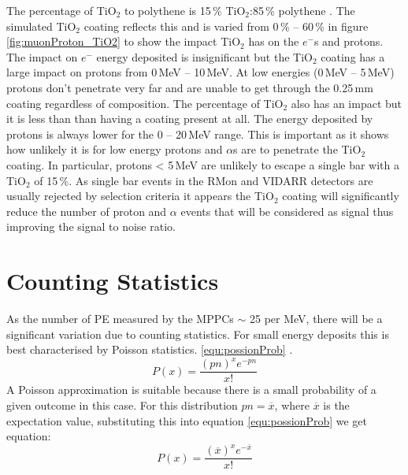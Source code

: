 
The percentage of TiO$_2$ to polythene is 15\,\% TiO$_2$:85\,\% polythene \cite{aliaga2014design} \cite{Pla-Dalmau2014}. The simulated TiO$_2$ coating reflects this and is varied from 0\,\% -- 60\,\% in figure \ref{fig:muonProton_TiO2} to show the impact TiO$_2$ has on the $e^-$s and protons. The impact on $e^-$ energy deposited is insignificant but the TiO$_2$ coating has a large impact on protons from 0\,MeV -- 10\,MeV. At low energies (0\,MeV -- 5\,MeV) protons don't penetrate very far and are unable to get through the 0.25\,mm coating regardless of composition. The percentage of TiO$_2$ also has an impact but it is less than than having a coating present at all. The energy deposited by protons is always lower for the 0 -- 20\,MeV range. This is important as it shows how unlikely it is for low energy protons and $\alpha$s are to penetrate the TiO$_2$ coating. In particular, protons < 5\,MeV are unlikely to escape a single bar with a TiO$_2$ of 15\,\%. As single bar events in the RMon and VIDARR detectors are usually rejected by selection criteria it appears the TiO$_2$ coating will significantly reduce the number of proton and $\alpha$ events that will be considered as signal thus improving the signal to noise ratio. 

\section{Counting Statistics} \label{sec:GEANT4Simulation_countingStats}
As the number of PE measured by the MPPCs $\sim$ 25 per MeV, there will be a significant variation due to counting statistics. For small energy deposits this is best characterised by Poisson statistics. \ref{equ:possionProb} \cite{knoll_2010}.
\begin{equation}
P(x) = \frac{(pn)^x e^{-pn}}{x!}  
\label{equ:possionProb}
\end{equation}
A Poisson approximation is suitable because there is a small probability of a given outcome in this case. For this distribution $pn = \overline{x}$, where $\overline{x}$ is the expectation value, substituting this into equation \ref{equ:possionProb} we get equation: 
\begin{equation}
P(x) = \frac{(\overline{x})^x e^{-\overline{x}}}{x!}  
\label{equ:possionExpectation}
\end{equation}

